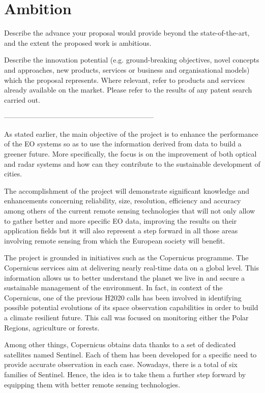 \section{Ambition}

Describe the advance your proposal would provide beyond the state-of-the-art, and the extent the proposed work is ambitious.

Describe the innovation potential (e.g. ground-breaking objectives, novel concepts and approaches, new products, services or business and organisational models) which the proposal represents. Where relevant, refer to products and services already available on the market. Please refer to the results of any patent search carried out.

---------------------------------------------------------------

As stated earlier, the main objective of the project is to enhance the performance of the EO systems so as to use the information derived from data to build a greener future. More specifically, the focus is on the improvement of both optical and radar systems and how can they contribute to the sustainable development of cities. 

The accomplishment of the project will demonstrate significant knowledge and enhancements concerning reliability, size, resolution, efficiency and accuracy among others of the current remote sensing technologies that will not only allow to gather better and more specific EO data, improving the results on their application fields but it will also represent a step forward in all those areas involving remote sensing from which the European society will benefit. 

The project is grounded in initiatives such as the Copernicus programme. The Copernicus services aim at delivering nearly real-time data on a global level. This information allows us to better understand the planet we live in and secure a sustainable management of the environment. In fact, in context of the Copernicus, one of the previous H2020 calls has been involved in identifying possible potential evolutions of its space observation capabilities in order to build a climate resilient future. This call was focused on monitoring either the Polar Regions, agriculture or forests.

Among other things, Copernicus obtains data thanks to a set of dedicated satellites named Sentinel. Each of them has been developed for a specific need to provide accurate observation in each case. Nowadays, there is a total of six families of Sentinel. Hence, the idea is to take them a further step forward by equipping them with better remote sensing technologies. 